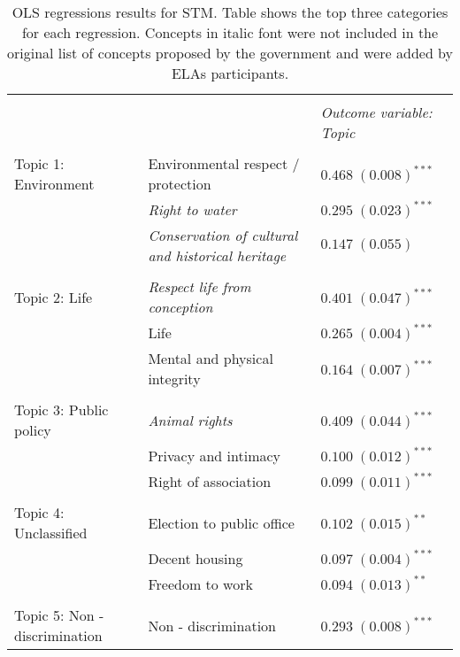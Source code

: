 \documentclass[onecolumn]{article}
\begin{document}
\begin{table}
\scriptsize
  \caption{OLS regressions results for STM. Table shows the top three categories for each regression. Concepts in italic font were not included in the original list of concepts proposed by the government and were added by ELAs participants.} 
  \label{tab:coef_stm} 
\begin{center}
\begin{tabular}{l l l }
\hline \\[-1.8ex] 
 &  & \textit{Outcome variable: Topic} \\ 
\hline \\[-1.8ex] 
Topic 1: Environment &  Environmental respect / protection                   & $0.468 \; (0.008)^{***}$ \\
& \textit{Right to water}                                            & $0.295 \; (0.023)^{***}$ \\
& \textit{Conservation of cultural and historical heritage}       & $0.147 \; (0.055)$       \\
\hline \\[-1.8ex] 
Topic 2: Life & \textit{Respect life from conception}                      & $0.401 \; (0.047)^{***}$ \\
& Life                                              & $0.265 \; (0.004)^{***}$ \\
& Mental and physical integrity                        & $0.164 \; (0.007)^{***}$ \\
\hline \\[-1.8ex] 
Topic 3: Public policy &  \textit{Animal rights}                                        & $0.409 \; (0.044)^{***}$ \\
& Privacy and intimacy                                 & $0.100 \; (0.012)^{***}$ \\
& Right of association                                 & $0.099 \; (0.011)^{***}$ \\
\hline \\[-1.8ex] 
Topic 4: Unclassified & Election to public office                         & $0.102 \; (0.015)^{**}$  \\
& Decent housing                                    & $0.097 \; (0.004)^{***}$ \\
& Freedom to work                                      & $0.094 \; (0.013)^{**}$  \\
\hline \\[-1.8ex] 
Topic 5: Non - discrimination & Non - discrimination                              & $0.293 \; (0.008)^{***}$ \\

\end{tabular}
\end{center}
\end{table}
\end{document}
